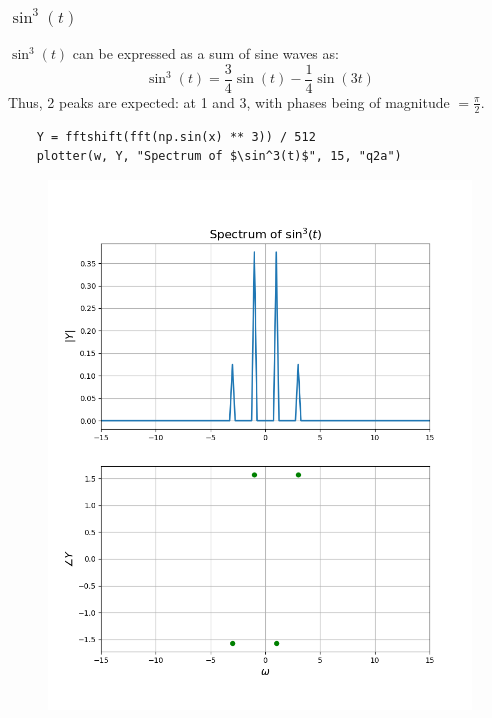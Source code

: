 \documentclass[12pt, a4paper]{article}
\begin{document}
\subsubsection{$\sin^3(t)$}
$\sin^3(t)$ can be expressed as a sum of sine waves as:
\begin{equation*}
    \sin^3(t) = \frac{3}{4}\sin(t) - \frac{1}{4}\sin(3t)
\end{equation*}
Thus, 2 peaks are expected: at 1 and 3, with phases being of magnitude $= \frac{\pi}{2}$.
\begin{lstlisting}
    Y = fftshift(fft(np.sin(x) ** 3)) / 512
    plotter(w, Y, "Spectrum of $\sin^3(t)$", 15, "q2a")
\end{lstlisting}
\begin{figure}[H]
    \centering
    \includegraphics[scale=0.6]{q2a.png}
\end{figure}
\end{document}
